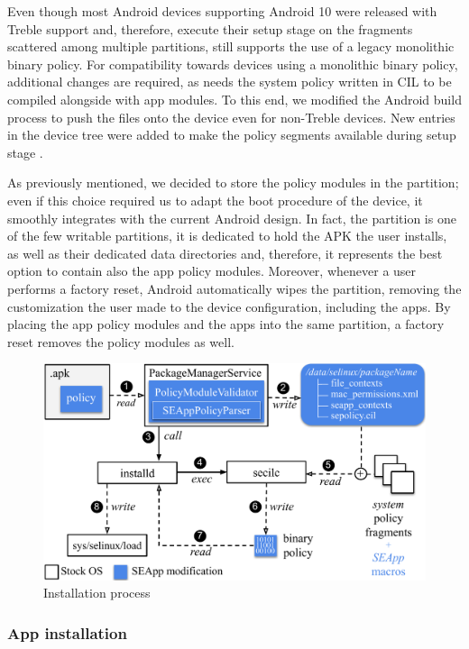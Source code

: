 Even though most Android devices supporting Android 10 were released
with Treble support and, therefore, execute their \sel setup stage on
the \sepolicy fragments scattered among multiple partitions, \init
still supports the use of a legacy monolithic binary policy.  For
compatibility towards devices using a monolithic binary policy,
additional changes are required, as \seapp needs the system policy
written in CIL to be compiled alongside with app modules.  To this
end, we modified the Android build process to push the \sepolicy files
onto the device even for non-Treble devices.  New entries in the
device tree were added to make the policy segments available during
\init \sel setup stage \cite{seapp_early}.

As previously mentioned, we decided to store the policy modules in the
\data partition; even if this choice required us to adapt the boot
procedure of the device, it smoothly integrates \seapp with the current
Android design.  In fact, the \data partition is one of the few
writable partitions, it is dedicated to hold the APK the user
installs, as well as their dedicated data directories and, therefore,
it represents the best option to contain also the app policy modules.
Moreover, whenever a user performs a factory reset, Android
automatically wipes the \data partition, removing the customization
the user made to the device configuration, including the apps.  By
placing the app policy modules and the apps into the same partition, a
factory reset removes the policy modules as well.

\begin{figure}[h]
	\begin{center}
		\includegraphics[width=0.8\columnwidth]{chapters/seapp/figs/app_installation}
	\end{center}
	\caption{\label{fig:seapp_install} Installation process}
\end{figure}

\subsubsection{App installation}

